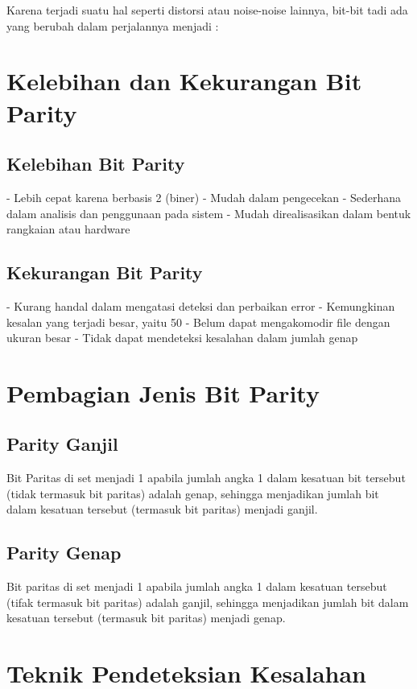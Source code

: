 Karena terjadi suatu hal seperti distorsi atau noise-noise lainnya, bit-bit tadi ada yang berubah dalam perjalannya menjadi :



\section{Kelebihan dan Kekurangan Bit Parity}
\subsection{Kelebihan Bit Parity}
-   Lebih cepat karena berbasis 2 (biner)
-   Mudah dalam pengecekan
-   Sederhana dalam analisis dan penggunaan pada sistem
-   Mudah direalisasikan dalam bentuk rangkaian atau hardware

\subsection{Kekurangan Bit Parity}
-   Kurang handal dalam mengatasi deteksi dan perbaikan error
-   Kemungkinan kesalan yang terjadi besar, yaitu 50%
-   Belum dapat mengakomodir file dengan ukuran besar
-   Tidak dapat mendeteksi kesalahan dalam jumlah genap



\section{Pembagian Jenis Bit Parity}
\subsection{Parity Ganjil}
Bit Paritas di set menjadi 1 apabila jumlah angka 1 dalam kesatuan bit tersebut (tidak termasuk bit paritas) adalah genap, sehingga menjadikan jumlah bit dalam kesatuan tersebut (termasuk bit paritas) menjadi ganjil.
 
\subsection{Parity Genap}
Bit paritas di set menjadi 1 apabila jumlah angka 1 dalam kesatuan tersebut (tifak termasuk bit paritas) adalah ganjil, sehingga menjadikan jumlah bit dalam kesatuan tersebut (termasuk bit paritas) menjadi genap.


\section{Teknik Pendeteksian Kesalahan}
